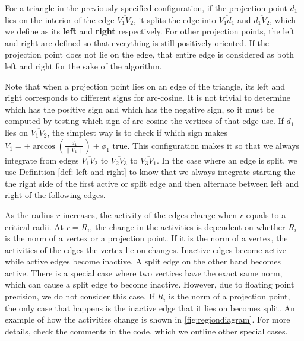 \documentclass[../paper.tex]{subfiles}
\begin{document}
\begin{definition}\label{def: left and right}
    For a triangle in the previously specified configuration, if the projection point $d_{1}$ lies on the interior of the edge $\overline{V_1V_2}$, it splits the edge into $\overline{V_1d_1}$ and $\overline{d_1V_2}$, 
    which we define as its \textbf{left} and \textbf{right} respectively. For other projection points, the left and right are defined so that everything is still positively oriented. 
    If the projection point does not lie on the edge, that entire edge is considered as both left and right for the sake of the algorithm. 
\end{definition}

Note that when a projection point lies on an edge of the triangle, its left and right corresponds to different signs for arc-cosine. 
It is not trivial to determine which has the positive sign and which has the negative sign, so it must be computed by testing which sign of arc-cosine the vertices of that edge use. 
If $d_1$ lies on $\overline{V_1V_2}$, the simplest way is to check if which sign makes $V_1 = \pm\arccos\left(\frac{d_1}{\|V_1\|}\right) + \phi_1$ true.
This configuration makes it so that we always integrate from edges $\overline{V_1V_2}$ to $\overline{V_2V_3}$ to $\overline{V_3V_1}$. 
In the case where an edge is split, we use Definition \ref{def: left and right} to know that we always integrate starting the the right side of the first active or split edge and then alternate between left and right of the following edges. 

As the radius $r$ increases, the activity of the edges change when $r$ equals to a critical radii. 
At $r=R_i$, the change in the activities is dependent on whether $R_i$ is the norm of a vertex or a projection point. 
If it is the norm of a vertex, the activities of the edges the vertex lie on changes. Inactive edges become active while active edges become inactive. 
A split edge on the other hand becomes active. There is a special case where two vertices have the exact same norm, which can cause a split edge to become inactive. 
However, due to floating point precision, we do not consider this case. If $R_i$ is the norm of a projection point, the only case that happens is the inactive edge that it lies on becomes split. 
An example of how the activities change is shown in \autoref{fig:regiondiagram}. For more details, check the comments in the code, which we outline other special cases. 
\end{document}
